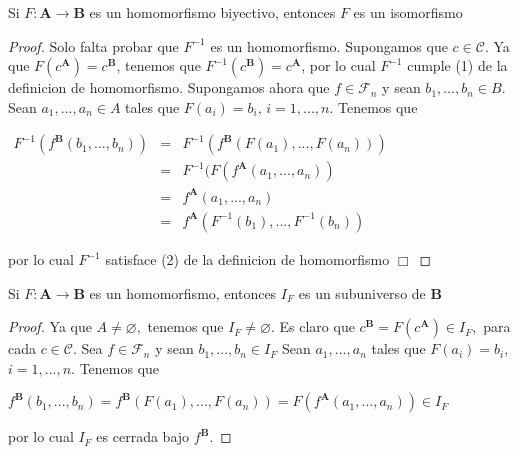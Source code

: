   \begin{lemma}
    Si \(F:\mathbf{A}\rightarrow \mathbf{B}\) es un homomorfismo biyectivo, entonces \(F\) es un isomorfismo
  \end{lemma}
  \begin{proof}
    Solo falta probar que \(F^{-1}\) es un homomorfismo. Supongamos que \(c\in \mathcal{C}\). Ya que \(F(c^{\mathbf{A}})=c^{\mathbf{B}}\), tenemos que \( F^{-1}(c^{\mathbf{B}})=c^{\mathbf{A}}\), por lo cual \(F^{-1}\) cumple (1) de la definicion de homomorfismo. Supongamos ahora que \(f\in \mathcal{F}_{n}\) y sean \(b_{1},...,b_{n}\in B\). Sean \(a_{1},...,a_{n}\in A\) tales que \( F(a_{i})=b_{i}\), \(i=1,...,n\). Tenemos que

    \(\displaystyle \begin{array}{ccl} F^{-1}(f^{\mathbf{B}}(b_{1},...,b_{n})) & = & F^{-1}(f^{\mathbf{B} }(F(a_{1}),...,F(a_{n}))) \\ & = & F^{-1}(F(f^{\mathbf{A}}(a_{1},...,a_{n})) \\ & = & f^{\mathbf{A}}(a_{1},...,a_{n}) \\ & = & f^{\mathbf{A}}(F^{-1}(b_{1}),...,F^{-1}(b_{n})) \end{array} \)

    por lo cual \(F^{-1}\) satisface (2) de la definicion de homomorfismo \(\Box\)
  \end{proof}

  \begin{lemma}
    Si \(F:\mathbf{A}\rightarrow \mathbf{B}\) es un homomorfismo, entonces \(I_{F}\) es un subuniverso de \(\mathbf{B}\)
  \end{lemma}
  \begin{proof}
    Ya que \(A\neq \varnothing ,\) tenemos que \(I_{F}\neq \varnothing .\) Es claro que \( c^{\mathbf{B}}=F(c^{\mathbf{A}})\in I_{F},\) para cada \(c\in \mathcal{C}\). Sea \(f\in \mathcal{F}_{n}\) y sean \(b_{1},...,b_{n}\in I_{F}\) Sean \( a_{1},...,a_{n}\) tales que \(F(a_{i})=b_{i},\) \(i=1,...,n\). Tenemos que

    \(\displaystyle f^{\mathbf{B}}(b_{1},...,b_{n})=f^{\mathbf{B}}(F(a_{1}),...,F(a_{n}))=F(f^{ \mathbf{A}}(a_{1},...,a_{n}))\in I_{F} \)

    por lo cual \(I_{F}\) es cerrada bajo \(f^{\mathbf{B}}\).
  \end{proof}

